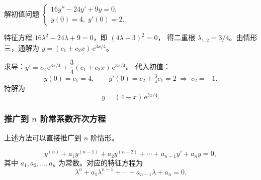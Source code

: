 \documentclass[lang=cn,11pt]{elegantbook}
\begin{document}
\begin{exercise}
解初值问题
$\begin{cases}
16y''-24y'+9y=0,\\
y(0)=4,\;y'(0)=2.
\end{cases}$
\end{exercise}
\begin{solution}
特征方程 $16\lambda^{2}-24\lambda+9=0$，即 $(4\lambda-3)^{2}=0$，
得二重根 $\lambda_{1,2}=3/4$。由情形三，通解为 $y=(c_1+c_2x)\,\mathrm{e}^{3x/4}$。

求导：$y'=c_2\,\mathrm{e}^{3x/4}+\dfrac34(c_1+c_2x)\,\mathrm{e}^{3x/4}$。
代入初值：
\[
y(0)=c_1=4,\qquad y'(0)=c_2+\tfrac34 c_1=2\;\Longrightarrow\;c_2=-1.
\]
特解为
\[
\boxed{y=(4-x)\,\mathrm{e}^{3x/4}}.
\]
\end{solution}


\subsubsection*{推广到 $n$ 阶常系数齐次方程}

上述方法可以直接推广到 $n$ 阶情形。

\begin{definition}[$n$ 阶常系数线性齐次方程]
\[
y^{(n)}+a_1y^{(n-1)}+a_2y^{(n-2)}+\cdots+a_{n-1}y'+a_ny=0,
\]
其中 $a_1,a_2,\dots,a_n$ 为常数。对应的特征方程为
\[
\lambda^n+a_1\lambda^{n-1}+\cdots+a_{n-1}\lambda+a_n=0.
\]
\end{definition}
\end{document}
